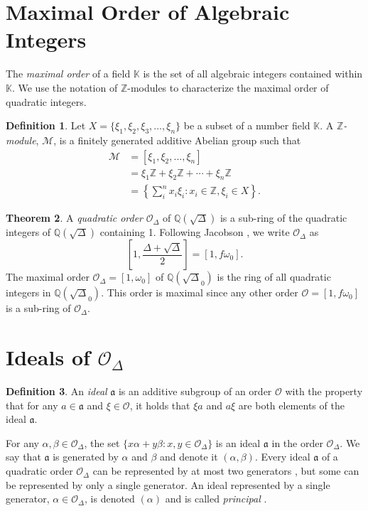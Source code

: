 \documentclass{ucalgthes1}
\theoremstyle{definition}
\newtheorem{thm}{Theorem}[section]
\newtheorem{defn}[thm]{Definition}
\newcommand{\KK}{\mathbb{K}}
\newcommand{\MM}{\mathcal{M}}
\newcommand{\OO}{\mathcal{O}}
\newcommand{\ZZ}{\mathbb{Z}}
\newcommand{\QQ}{\mathbb{Q}}
\begin{document}
\bigbreak
\section{Maximal Order of Algebraic Integers}

The \emph{maximal order} of a field $\KK$ is the set of all algebraic integers contained within $\KK$.  We use the notation of $\ZZ$-modules to characterize the maximal order of quadratic integers.


\begin{defn}
Let $X = \{ \xi_1, \xi_2, \xi_3, ..., \xi_n \}$ be a subset of a number field $\KK$.  A \emph{$\ZZ$\mbox{-}module}, $\MM$, is a finitely generated additive Abelian group such that
\begin{align*}
	\MM &= [ \xi_1, \xi_2, ..., \xi_n ] \\
	& =  \xi_1 \ZZ + \xi_2 \ZZ + \cdots + \xi_n \ZZ \\
	& = \left \{ \sum_{i}^n x_i \xi_i : x_i \in \ZZ, \xi_i \in X \right \}.
\end{align*}
\end{defn}

\begin{thm}
A \emph{quadratic order} $\OO_\Delta$ of $\QQ(\sqrt\Delta)$ is a sub-ring of the quadratic integers of $\QQ(\sqrt\Delta)$ containing 1.  Following Jacobson \cite[p.81]{Jacobson2009}, we write $\OO_\Delta$ as
\[
	\left[ 1, \frac{\Delta + \sqrt{\Delta}}{2} \right] = [1, f\omega_0].
\]
The maximal order $\OO_\Delta = [1, \omega_0]$ of $\QQ(\sqrt\Delta_0)$ is the ring of all quadratic integers in $\QQ(\sqrt\Delta_0)$.  This order is maximal since any other order $\OO = [1, f\omega_0]$ is a sub-ring of $\OO_\Delta$. 
\end{thm}


\bigbreak
\section{Ideals of $\OO_\Delta$}

\begin{defn}
An \emph{ideal} $\mathfrak a$ is an additive subgroup of an order $\OO$ with the property that for any $a \in \mathfrak a$ and $\xi \in \OO$, it holds that $\xi a$ and $a \xi$ are both elements of the ideal $\mathfrak a$.
\end{defn}

For any $\alpha, \beta \in \OO_\Delta$, the set $\{x \alpha + y \beta : x, y \in \OO_\Delta\}$ is an ideal $\mathfrak a$ in the order $\OO_\Delta$.  We say that $\mathfrak a$ is generated by $\alpha$ and $\beta$ and denote it $(\alpha, \beta)$.  Every ideal $\mathfrak a$ of a quadratic order $\OO_\Delta$ can be represented by at most two generators \cite{Cohn1980}, but some can be represented by only a single generator. An ideal represented by a single generator, $\alpha \in \OO_\Delta$, is denoted $(\alpha)$ and is called \emph{principal} \cite[p.87]{Jacobson2009}.
\end{document}

